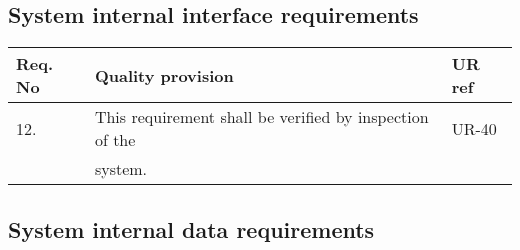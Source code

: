 \subsection{System internal interface requirements}
\begin{center}
    \begin{tabular}{ | l | p{9cm} | l |}
    \hline	  
    Req. No & Quality provision  									& UR ref \\ \hline
		12. & This requirement shall be verified by inspection of the  & UR-40 \\
            & system.                                               &\\ \hline           
    \end{tabular}
\end{center}

\subsection{System internal data requirements}
